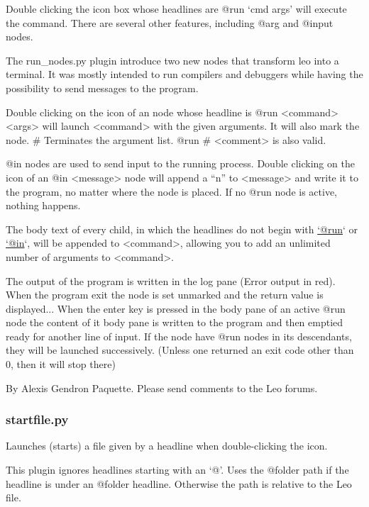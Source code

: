 \documentclass[a4paper,10pt,english]{sphinxmanual}
\begin{document}
Double clicking the icon box whose headlines are @run `cmd args' will execute
the command. There are several other features, including @arg and @input nodes.

The run\_nodes.py plugin introduce two new nodes that transform leo into a
terminal. It was mostly intended to run compilers and debuggers while having the
possibility to send messages to the program.

Double clicking on the icon of an node whose headline is @run \textless{}command\textgreater{} \textless{}args\textgreater{}
will launch \textless{}command\textgreater{} with the given arguments. It will also mark the node. \#
Terminates the argument list. @run \# \textless{}comment\textgreater{} is also valid.

@in nodes are used to send input to the running process. Double clicking on
the icon of an @in \textless{}message\textgreater{} node will append a ``n'' to \textless{}message\textgreater{} and write it
to the program, no matter where the node is placed. If no @run node is active,
nothing happens.

The body text of every child, in which the headlines do not begin with \href{mailto:'@run}{`@run}`
or \href{mailto:'@in}{`@in}`, will be appended to \textless{}command\textgreater{}, allowing you to add an unlimited number
of arguments to \textless{}command\textgreater{}.

The output of the program is written in the log pane (Error output in red).
When the program exit the node is set unmarked and the return value is
displayed... When the enter key is pressed in the body pane of an active @run
node the content of it body pane is written to the program and then emptied
ready for another line of input. If the node have @run nodes in its descendants,
they will be launched successively. (Unless one returned an exit code other
than 0, then it will stop there)

By Alexis Gendron Paquette. Please send comments to the Leo forums.


\subsubsection{startfile.py}
\label{plugins:startfile-py}
Launches (starts) a file given by a headline when double-clicking the icon.

This plugin ignores headlines starting with an `@'. Uses the @folder path if the
headline is under an @folder headline. Otherwise the path is relative to the Leo
file.
\end{document}

